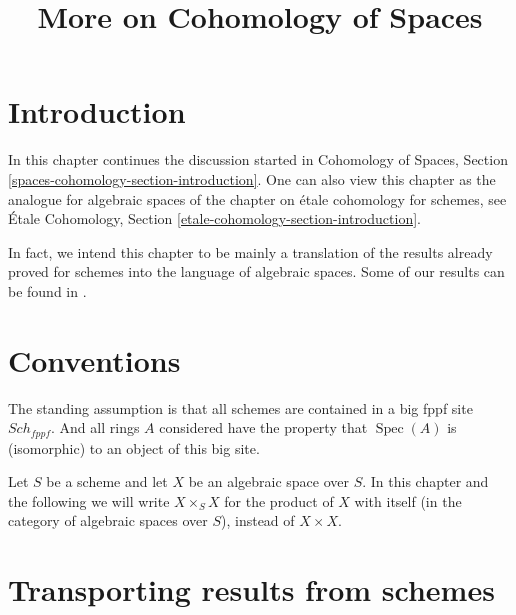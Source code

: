 \documentclass{stacks-project}
\theoremstyle{plain}
\theoremstyle{definition}
\theoremstyle{remark}
\numberwithin{equation}{subsection}
\def\Spec{\mathop{\mathrm{Spec}}}
\def\Sch{\mathit{Sch}}
\begin{document}
\title{More on Cohomology of Spaces}

\maketitle

\label{section-phantom}

\tableofcontents




\section{Introduction}
\label{section-introduction}

\noindent
In this chapter continues the discussion started in
Cohomology of Spaces, Section \ref{spaces-cohomology-section-introduction}.
One can also view this chapter as the analogue for algebraic spaces
of the chapter on \'etale cohomology for schemes, see
\'Etale Cohomology, Section \ref{etale-cohomology-section-introduction}.

\medskip\noindent
In fact, we intend this chapter to be mainly a translation of the
results already proved for schemes into the language of algebraic
spaces. Some of our results can be found in \cite{Kn}.





\section{Conventions}
\label{section-conventions}

\noindent
The standing assumption is that all schemes are contained in
a big fppf site $\Sch_{fppf}$. And all rings $A$ considered
have the property that $\Spec(A)$ is (isomorphic) to an
object of this big site.

\medskip\noindent
Let $S$ be a scheme and let $X$ be an algebraic space over $S$.
In this chapter and the following we will write $X \times_S X$
for the product of $X$ with itself (in the category of algebraic
spaces over $S$), instead of $X \times X$.







\section{Transporting results from schemes}
\label{section-api}
\end{document}
